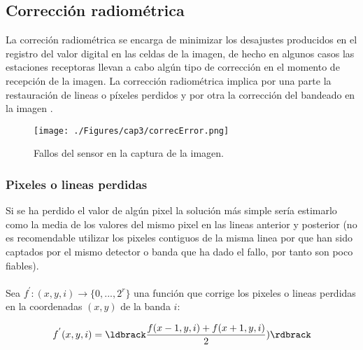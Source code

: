 \subsection{Correcci\'on radiom\'etrica}
La correci\'on radiom\'etrica se encarga de minimizar los desajustes producidos en el registro del valor digital en las celdas de la imagen, de hecho en algunos casos las estaciones receptoras llevan a cabo alg\'un tipo de correcci\'on en el momento de recepci\'on de la imagen. La corrección radiom\'etrica implica por una parte la restauraci\'on de lineas o p\'ixeles perdidos y por otra la correcci\'on del bandeado en la imagen \cite{teledUm}.
    \begin{figure}[H]
    	\centering
    	\texttt{[image: ./Figures/cap3/correcError.png]}
    	\caption{Fallos del sensor en la captura de la imagen.}
    	\label{fig:correcError}
    \end{figure}

\subsubsection{Pixeles o lineas perdidas}\label{subsec:pixelesP}
Si se ha perdido el valor de alg\'un pixel la solución m\'as simple ser\'ia estimarlo como la media de los valores
del mismo pixel en las lineas anterior y posterior (no es recomendable utilizar los pixeles contiguos de la misma linea por que han sido captados por el mismo detector o banda que ha dado el fallo, por tanto son poco fiables).\\~\\
Sea $ f^{'}:(x,y,i)\longrightarrow \{0,...,2^{r}\} $ una funci\'on que corrige los pixeles o lineas perdidas en la coordenadas $ (x,y) $ de la banda $ i $:

		\begin{equation}
		f^{'}(x,y,i) = \ldbrack \dfrac{f(x-1,y,i) + f(x+1,y,i)}{2}) \rdbrack
		\end{equation} 

